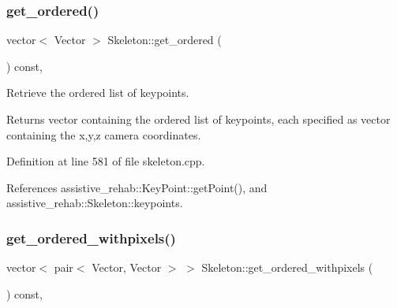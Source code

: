 \mbox{\label{classassistive__rehab_1_1Skeleton_a9c56f7f9e243ae2c4c3fef6dbb051dc2}} 
\subsubsection{\texorpdfstring{get\_ordered()}{get\_ordered()}}
{\footnotesize\ttfamily vector$<$ Vector $>$ Skeleton\+::get\+\_\+ordered (\begin{DoxyParamCaption}{ }\end{DoxyParamCaption}) const\hspace{0.3cm}{\ttfamily [virtual]}, {\ttfamily [inherited]}}



Retrieve the ordered list of keypoints. 

\begin{DoxyReturn}{Returns}
vector containing the ordered list of keypoints, each specified as vector containing the x,y,z camera coordinates. 
\end{DoxyReturn}


Definition at line 581 of file skeleton.\+cpp.


\begin{DoxyCode}{0}

\end{DoxyCode}


References assistive\+\_\+rehab\+::\+Key\+Point\+::get\+Point(), and assistive\+\_\+rehab\+::\+Skeleton\+::keypoints.

\mbox{\label{classassistive__rehab_1_1Skeleton_a270506cde494cb4261c7892edb46ce53}} 
\subsubsection{\texorpdfstring{get\_ordered\_withpixels()}{get\_ordered\_withpixels()}}
{\footnotesize\ttfamily vector$<$ pair$<$ Vector, Vector $>$ $>$ Skeleton\+::get\+\_\+ordered\+\_\+withpixels (\begin{DoxyParamCaption}{ }\end{DoxyParamCaption}) const\hspace{0.3cm}{\ttfamily [virtual]}, {\ttfamily [inherited]}}



